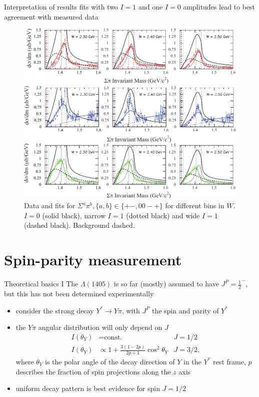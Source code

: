 \documentclass[11pt,aspectratio=1610,dvipsnames]{beamer}
\begin{document}
\begin{frame}{Interpretation of results}
	fits with two $I=1$ and one $I=0$ amplitudes lead to best agreement with measured data 
	\begin{figure}
		\centering
		\includegraphics[width=.57\linewidth]{CLAS_lineshape_all}
		\caption*{Data and fits for $\Sigma^a\pi^b, \{a,b\}\in\{+-,00-+\}$  for different bins in $W$. $I=0$ (solid black), narrow $I=1$ (dotted black) and wide $I=1$ (dashed black). Background dashed. \citet{lineshapes}}
	\end{figure}
	
	
\end{frame}





\section{Spin-parity measurement}
\begin{frame}{Theoretical basics I}
	The $\Lambda(1405)$ is so far (mostly) assumed to have $J^P=\frac{1}{2}^-$, but this has not been determined experimentally
	\begin{tcolorbox}[colback=black!10,colframe=gray!20!black,title=Measuring spin] 
		\begin{itemize}
			\item consider the strong decay $Y^*\to Y\pi$, with $J^P$ the spin and parity of $Y^*$
			\item the $Y\pi$ angular distribution will only depend on $J$
			\begin{align*}
				I(\theta_Y)&=\text{const.} & J=1/2\\
				I(\theta_Y)&\propto 1+\frac{3(1-2p)}{2p+1}\cos^2\theta_Y& J=3/2,
			\end{align*}
			where $\theta_Y$ is the polar angle of the decay direction of $Y$ in the $Y^*$ rest frame, $p$ describes the fraction of spin projections along the $z$ axis 
			\item uniform decay pattern is best evidence for spin $J=1/2$
			
		\end{itemize}
	\end{tcolorbox}
	\begin{flushright}
	\end{flushright}
	
\end{frame}
\end{document}
